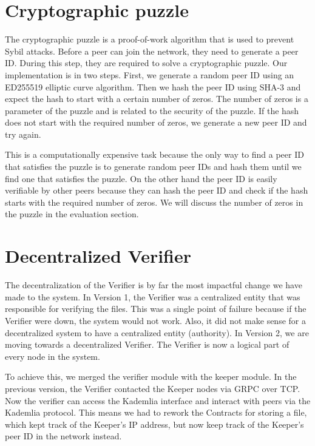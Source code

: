 \section{Cryptographic puzzle}

The cryptographic puzzle is a proof-of-work algorithm that is used to prevent Sybil attacks.
Before a peer can join the network, they need to generate a peer ID.
During this step, they are required to solve a cryptographic puzzle.
Our implementation is in two steps.
First, we generate a random peer ID using an ED255519 elliptic curve algorithm.
Then we hash the peer ID using SHA-3 and expect the hash to start with a certain number of zeros.
The number of zeros is a parameter of the puzzle and is related to the security of the puzzle.
If the hash does not start with the required number of zeros, we generate a new peer ID and try again.

This is a computationally expensive task because the only way to find a peer ID that satisfies the puzzle is to generate random peer IDs and hash them until we find one that satisfies the puzzle.
On the other hand the peer ID is easily verifiable by other peers because they can hash the peer ID and check if the hash starts with the required number of zeros.
We will discuss the number of zeros in the puzzle in the evaluation section.

\section{Decentralized Verifier}

The decentralization of the Verifier is by far the most impactful change we have made to the system.
In Version 1, the Verifier was a centralized entity that was responsible for verifying the files.
This was a single point of failure because if the Verifier were down, the system would not work.
Also, it did not make sense for a decentralized system to have a centralized entity (authority).
In Version 2, we are moving towards a decentralized Verifier.
The Verifier is now a logical part of every node in the system.

To achieve this, we merged the verifier module with the keeper module.
In the previous version, the Verifier contacted the Keeper nodes via GRPC over TCP.
Now the verifier can access the Kademlia interface and interact with peers via the Kademlia protocol.
This means we had to rework the Contracts for storing a file, which kept track of the Keeper's IP address,
but now keep track of the Keeper's peer ID in the network instead.

